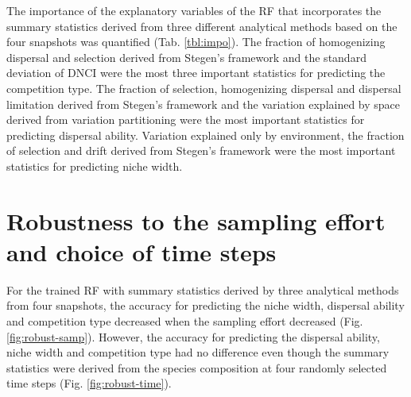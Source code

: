 The importance of the explanatory variables of the RF that incorporates the summary statistics derived from three different analytical methods based on the four snapshots was quantified (Tab. \ref{tbl:impo}). The fraction of homogenizing dispersal and selection derived from Stegen's framework and the standard deviation of DNCI were the most three important statistics for predicting the competition type. The fraction of selection, homogenizing dispersal and dispersal limitation derived from Stegen's framework and the variation explained by space derived from variation partitioning were the most important statistics for predicting dispersal ability. Variation explained only by environment, the fraction of selection and drift derived from Stegen's framework were the most important statistics for predicting niche width.

%
%

\section{Robustness to the sampling effort and choice of time steps}
\noindent
For the trained RF with summary statistics derived by three analytical methods from four snapshots, the accuracy for predicting the niche width, dispersal ability and competition type decreased when the sampling effort decreased (Fig. \ref{fig:robust-samp}). However, the accuracy for predicting the dispersal ability, niche width and competition type had no difference even though the summary statistics were derived from the species composition at four randomly selected time steps (Fig. \ref{fig:robust-time}). 

